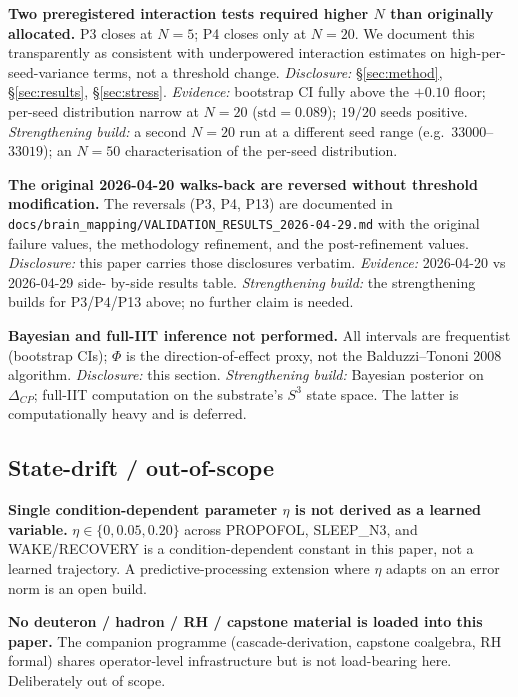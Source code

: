 \textbf{Two preregistered interaction tests required higher $N$
than originally allocated.} P3 closes at $N\!=\!5$; P4 closes only at
$N\!=\!20$. We document this transparently as consistent with
underpowered interaction estimates on high-per-seed-variance terms,
not a threshold change. \emph{Disclosure:}
\S\ref{sec:method}, \S\ref{sec:results}, \S\ref{sec:stress}.
\emph{Evidence:} bootstrap CI fully above the $+0.10$ floor; per-seed
distribution narrow at $N\!=\!20$ ($\mathrm{std}=0.089$);
$19/20$ seeds positive. \emph{Strengthening build:} a second
$N\!=\!20$ run at a different seed range (e.g.\ $33000$--$33019$);
an $N\!=\!50$ characterisation of the per-seed distribution.

\textbf{The original 2026-04-20 walks-back are reversed without
threshold modification.} The reversals (P3, P4, P13) are documented
in
\texttt{docs/brain\_mapping/VALIDATION\_RESULTS\_2026-04-29.md} with
the original failure values, the methodology refinement, and the
post-refinement values. \emph{Disclosure:} this paper carries those
disclosures verbatim. \emph{Evidence:} 2026-04-20 vs 2026-04-29 side-
by-side results table. \emph{Strengthening build:} the strengthening
builds for P3/P4/P13 above; no further claim is needed.

\textbf{Bayesian and full-IIT inference not performed.} All intervals
are frequentist (bootstrap CIs); $\Phi$ is the direction-of-effect
proxy, not the Balduzzi--Tononi 2008 algorithm. \emph{Disclosure:}
this section. \emph{Strengthening build:} Bayesian posterior on
$\Delta_{CP}$; full-IIT computation on the
substrate's $S^{3}$ state space. The latter is computationally
heavy and is deferred.

\subsection{State-drift / out-of-scope}\label{ssec:scope}

\textbf{Single condition-dependent parameter $\eta$ is not derived
as a learned variable.} $\eta\in\{0, 0.05, 0.20\}$ across PROPOFOL,
SLEEP\_N3, and WAKE/RECOVERY is a condition-dependent constant in
this paper, not a learned trajectory. A predictive-processing
extension where $\eta$ adapts on an error norm is an open build.

\textbf{No deuteron / hadron / RH / capstone material is loaded into
this paper.} The companion programme (cascade-derivation, capstone
coalgebra, RH formal) shares operator-level infrastructure but is not
load-bearing here. Deliberately out of scope.

